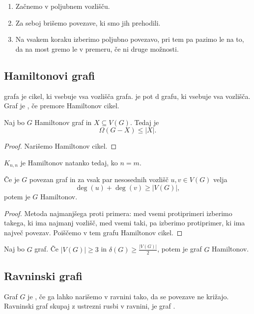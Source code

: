 \begin{enumerate}
    \item Začnemo v poljubnem vozlišču.
    \item Za seboj brišemo povezave, ki smo jih prehodili.
    \item Na vsakem koraku izberimo poljubno povezavo, pri tem pa pazimo le na to, da na most gremo le v premeru, če ni druge možnosti.
\end{enumerate}

\subsection{Hamiltonovi grafi}
\begin{definicija}
     grafa je cikel, ki vsebuje vsa vozlišča grafa.  je pot d grafu, ki vsebuje vsa vozlišča. Graf je , če premore Hamiltonov cikel.
\end{definicija}

\begin{izrek}
    Naj bo $G$ Hamiltonov graf in $X \subseteq V(G)$. Tedaj je $$\Omega(G-X) \leq |X|.$$
\end{izrek}

\begin{proof}
    Narišemo Hamiltonov cikel.
\end{proof}

\begin{primer}
    $K_{n,n}$ je Hamiltonov natanko tedaj, ko $n=m$.
\end{primer}

\begin{izrek}[Ore]
    Če je $G$ povezan graf in za vsak par nesosednih vozlišč $u, v \in V(G)$ velja $$\deg(u)+\deg(v) \geq |V(G)|,$$ potem je $G$ Hamiltonov.
\end{izrek}

\begin{proof}
    Metoda najmanjšega proti primera: med vsemi protiprimeri izberimo takega, ki ima najmanj vozlišč, med vsemi taki, pa izberimo protiprimer, ki ima največ povezav. Poiščemo v tem grafu Hamiltonov cikel.
\end{proof}

\begin{izrek}[Dirac]
    Naj bo $G$ graf. Če $|V(G)| \geq 3$ in $\delta(G) \geq \frac{|V(G)|}{2}$, potem je graf $G$ Hamiltonov.
\end{izrek}

\subsection{Ravninski grafi}
\begin{definicija}
    Graf $G$ je , če ga lahko narišemo v ravnini tako, da se povezave ne križajo. Ravninski graf skupaj z ustrezni rusbi v ravnini, je graf .
\end{definicija}

